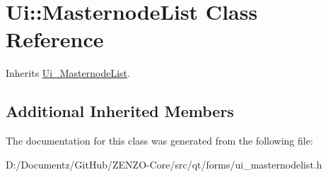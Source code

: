 \hypertarget{class_ui_1_1_masternode_list}{}\section{Ui\+::Masternode\+List Class Reference}
\label{class_ui_1_1_masternode_list}


Inherits \mbox{\hyperlink{class_ui___masternode_list}{Ui\+\_\+\+Masternode\+List}}.

\subsection*{Additional Inherited Members}


The documentation for this class was generated from the following file\+:\begin{DoxyCompactItemize}
\item 
D\+:/\+Documentz/\+Git\+Hub/\+Z\+E\+N\+Z\+O-\/\+Core/src/qt/forms/ui\+\_\+masternodelist.\+h\end{DoxyCompactItemize}
